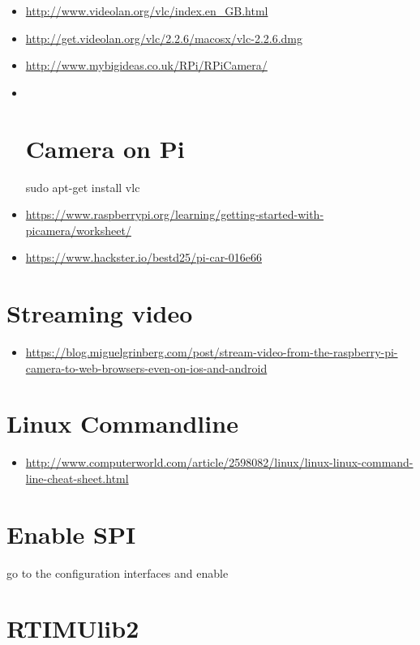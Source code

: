 \begin{itemize}
\item
  \url{http://www.videolan.org/vlc/index.en_GB.html}
\item
  \url{http://get.videolan.org/vlc/2.2.6/macosx/vlc-2.2.6.dmg}
\item
  \url{http://www.mybigideas.co.uk/RPi/RPiCamera/}
\item ~
  \section{Camera on Pi}\label{camera-on-pi}

  sudo apt-get install vlc
\item
  \url{https://www.raspberrypi.org/learning/getting-started-with-picamera/worksheet/}
\item
  \url{https://www.hackster.io/bestd25/pi-car-016e66}
\end{itemize}

\section{Streaming video}\label{streaming-video}

\begin{itemize}
\tightlist
\item
  \url{https://blog.miguelgrinberg.com/post/stream-video-from-the-raspberry-pi-camera-to-web-browsers-even-on-ios-and-android}
\end{itemize}

\section{Linux Commandline}\label{linux-commandline}

\begin{itemize}
\tightlist
\item
  \url{http://www.computerworld.com/article/2598082/linux/linux-linux-command-line-cheat-sheet.html}
\end{itemize}

\section{Enable SPI}\label{enable-spi}

go to the configuration interfaces and enable

\section{RTIMUlib2}\label{rtimulib2}

